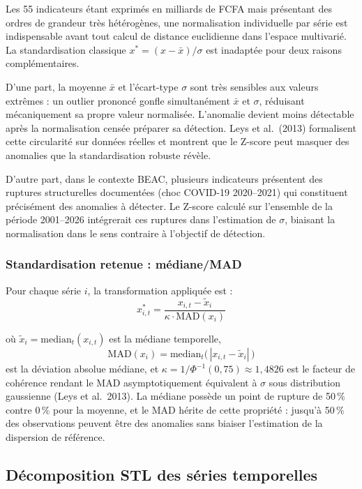 \documentclass[12pt,a4paper]{article}
\begin{document}
Les 55 indicateurs étant exprimés en milliards de FCFA mais présentant des
ordres de grandeur très hétérogènes, une normalisation individuelle par série
est indispensable avant tout calcul de distance euclidienne dans l'espace
multivarié. La standardisation classique $x^* = (x - \bar{x}) / \sigma$ est
inadaptée pour deux raisons complémentaires.

D'une part, la moyenne $\bar{x}$ et l'écart-type $\sigma$ sont très sensibles
aux valeurs extrêmes : un outlier prononcé gonfle simultanément $\bar{x}$ et
$\sigma$, réduisant mécaniquement sa propre valeur normalisée. L'anomalie
devient moins détectable après la normalisation censée préparer sa détection.
Leys et al.\ (2013) formalisent cette circularité sur données réelles et
montrent que le Z-score peut masquer des anomalies que la standardisation
robuste révèle.

D'autre part, dans le contexte BEAC, plusieurs indicateurs présentent des
ruptures structurelles documentées (choc COVID-19 2020--2021) qui constituent
précisément des anomalies à détecter. Le Z-score calculé sur l'ensemble de
la période 2001--2026 intégrerait ces ruptures dans l'estimation de $\sigma$,
biaisant la normalisation dans le sens contraire à l'objectif de détection.

\subsubsection{Standardisation retenue : médiane/MAD}

Pour chaque série $i$, la transformation appliquée est :
$$x_{i,t}^* = \frac{x_{i,t} - \tilde{x}_i}
                    {\kappa \cdot \mathrm{MAD}(x_i)}$$

où $\tilde{x}_i = \mathrm{median}_t(x_{i,t})$ est la médiane temporelle,
$$\mathrm{MAD}(x_i) =
\mathrm{median}_t\!\bigl(\,|x_{i,t} - \tilde{x}_i|\,\bigr)$$
est la déviation absolue médiane, et
$\kappa = 1/\Phi^{-1}(0{,}75) \approx 1{,}4826$ est le facteur de cohérence
rendant le MAD asymptotiquement équivalent à $\sigma$ sous distribution
gaussienne (Leys et al.\ 2013). La médiane possède un point de rupture de
50\,\% contre 0\,\% pour la moyenne, et le MAD hérite de cette propriété :
jusqu'à 50\,\% des observations peuvent être des anomalies sans biaiser
l'estimation de la dispersion de référence.

\subsection{Décomposition STL des séries temporelles}
\end{document}
